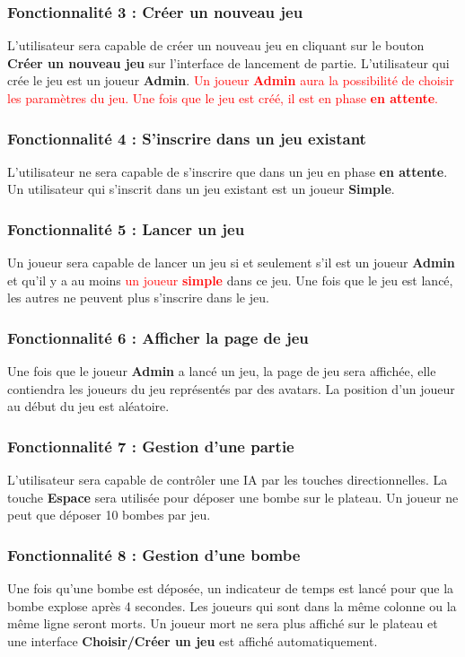 \subsubsection{Fonctionnalité  3 : Créer un nouveau jeu}
L'utilisateur sera capable de créer un nouveau jeu en cliquant sur le bouton \textbf{Créer un nouveau jeu} sur l'interface de lancement de partie. L'utilisateur qui crée le jeu est un joueur \textbf{Admin}. \textcolor{red}{Un joueur \textbf{Admin} aura la possibilité de choisir les paramètres du jeu. Une fois que le jeu est créé, il est en phase \textbf{en attente}.}
\subsubsection{Fonctionnalité  4 : S'inscrire dans un jeu existant}
L'utilisateur ne sera capable de s'inscrire que dans un jeu en phase \textbf{en attente}. Un utilisateur qui s'inscrit dans un jeu existant est un joueur \textbf{Simple}.
\subsubsection{Fonctionnalité 5 : Lancer un jeu}
Un joueur sera capable de lancer un jeu si et seulement s'il est un joueur \textbf{Admin} et qu'il y a au moins \textcolor{red}{un joueur \textbf{simple}} dans ce jeu. Une fois que le jeu est lancé, les autres ne peuvent plus s'inscrire dans le jeu.

\subsubsection{Fonctionnalité 6 : Afficher la page de jeu}
Une fois que le joueur \textbf{Admin} a lancé un jeu, la page de jeu sera affichée, elle contiendra les joueurs du jeu représentés par des avatars. La position d'un joueur au début du jeu est aléatoire. 

\subsubsection{Fonctionnalité 7 : Gestion d'une partie}
L'utilisateur sera capable de contrôler une IA par les touches directionnelles. La touche \textbf{Espace} sera utilisée pour déposer une bombe sur le plateau. Un joueur ne peut que déposer 10 bombes par jeu.

\subsubsection{Fonctionnalité 8 : Gestion d'une bombe}
Une fois qu'une bombe est déposée, un indicateur de temps est lancé pour que la bombe explose après 4 secondes. Les joueurs qui sont dans la même colonne ou la même ligne seront morts. Un joueur mort ne sera plus affiché sur le plateau et une interface \textbf{Choisir/Créer un jeu} est affiché automatiquement.
